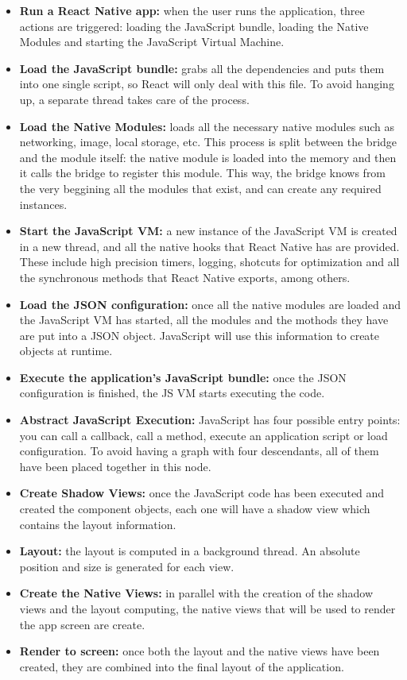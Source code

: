 \begin{itemize}
 \item \textbf{Run a React Native app:} when the user runs the application, three actions are triggered: loading the JavaScript bundle, loading the Native Modules and starting the JavaScript Virtual Machine.
 \item \textbf{Load the JavaScript bundle:} grabs all the dependencies and puts them into one single script, so React will only deal with this file. To avoid hanging up, a separate thread takes care of the process.
 \item \textbf{Load the Native Modules:} loads all the necessary native modules such as networking, image, local storage, etc. This process is split between the bridge and the module itself: the native module is loaded into the memory and then it calls the bridge to register this module. This way, the bridge knows from the very beggining all the modules that exist, and can create any required instances.
 \item \textbf{Start the JavaScript VM:} a new instance of the JavaScript VM is created in a new thread, and all the native hooks that React Native has are provided. These include high precision timers, logging, shotcuts for optimization and all the synchronous methods that React Native exports, among others.
 \item \textbf{Load the JSON configuration:} once all the native modules are loaded and the JavaScript VM has started, all the modules and the mothods they have are put into a JSON object. JavaScript will use this information to create objects at runtime.
 \item \textbf{Execute the application's JavaScript bundle:} once the JSON configuration is finished, the JS VM starts executing the code.
 \item \textbf{Abstract JavaScript Execution:} JavaScript has four possible entry points: you can call a callback, call a method, execute an application script or load configuration. To avoid having a graph with four descendants, all of them have been placed together in this node.
 \item \textbf{Create Shadow Views:} once the JavaScript code has been executed and created the component objects, each one will have a shadow view which contains the layout information.
 \item \textbf{Layout:} the layout is computed in a background thread. An absolute position and size is generated for each view.
 \item \textbf{Create the Native Views:} in parallel with the creation of the shadow views and the layout computing, the native views that will be used to render the app screen are create.
 \item \textbf{Render to screen:} once both the layout and the native views have been created, they are combined into the final layout of the application.
\end{itemize}

